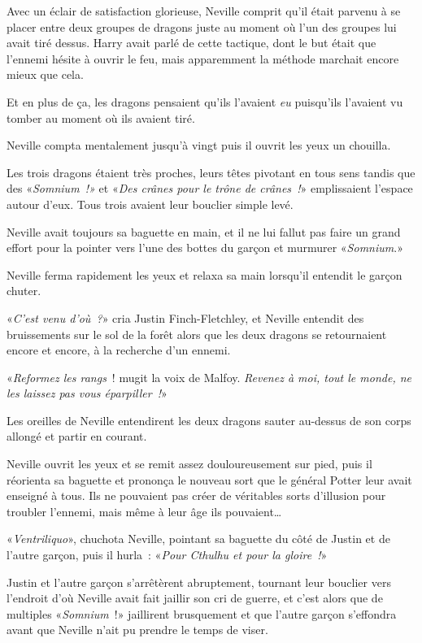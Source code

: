 Avec un éclair de satisfaction glorieuse, Neville comprit qu'il était parvenu à se placer entre deux groupes de dragons juste au moment où l'un des groupes lui avait tiré dessus. Harry avait parlé de cette tactique, dont le but était que l'ennemi hésite à ouvrir le feu, mais apparemment la méthode marchait encore mieux que cela.

Et en plus de ça, les dragons pensaient qu'ils l'avaient \emph{eu} puisqu'ils l'avaient vu tomber au moment où ils avaient tiré.

Neville compta mentalement jusqu'à vingt puis il ouvrit les yeux un chouilla.

Les trois dragons étaient très proches, leurs têtes pivotant en tous sens tandis que des «\emph{Somnium~!»} et «\emph{Des crânes pour le trône de crânes~!}» emplissaient l'espace autour d'eux. Tous trois avaient leur bouclier simple levé.

Neville avait toujours sa baguette en main, et il ne lui fallut pas faire un grand effort pour la pointer vers l'une des bottes du garçon et murmurer «\emph{Somnium}.»

Neville ferma rapidement les yeux et relaxa sa main lorsqu'il entendit le garçon chuter.

«\emph{C'est venu d'où~?}» cria Justin Finch-Fletchley, et Neville entendit des bruissements sur le sol de la forêt alors que les deux dragons se retournaient encore et encore, à la recherche d'un ennemi.

«\emph{Reformez les rangs}~! mugit la voix de Malfoy. \emph{Revenez à moi, tout le monde, ne les laissez pas vous éparpiller~!}»

Les oreilles de Neville entendirent les deux dragons sauter au-dessus de son corps allongé et partir en courant.

Neville ouvrit les yeux et se remit assez douloureusement sur pied, puis il réorienta sa baguette et prononça le nouveau sort que le général Potter leur avait enseigné à tous. Ils ne pouvaient pas créer de véritables sorts d'illusion pour troubler l'ennemi, mais même à leur âge ils pouvaient…

«\emph{Ventriliquo}», chuchota Neville, pointant sa baguette du côté de Justin et de l'autre garçon, puis il hurla~: «\emph{Pour Cthulhu et pour la gloire~!}»

Justin et l'autre garçon s'arrêtèrent abruptement, tournant leur bouclier vers l'endroit d'où Neville avait fait jaillir son cri de guerre, et c'est alors que de multiples «\emph{Somnium}~!» jaillirent brusquement et que l'autre garçon s'effondra avant que Neville n'ait pu prendre le temps de viser.

